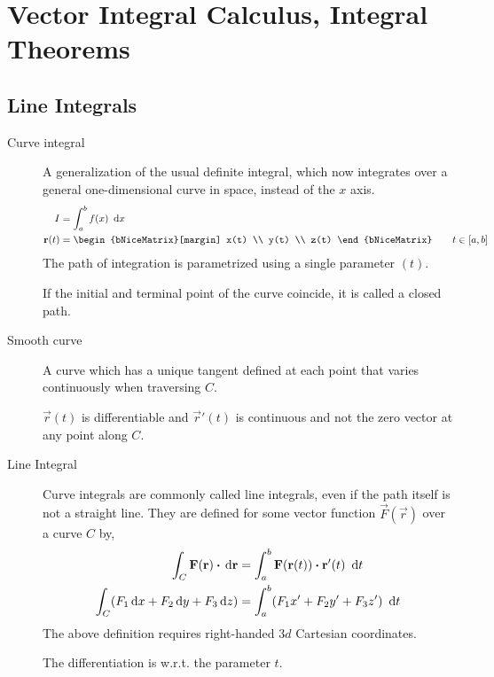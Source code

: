 \chapter{Vector Integral Calculus, Integral Theorems}

\section{Line Integrals}

\begin{description}
    \item[Curve integral] A generalization of the usual definite integral, which now
        integrates over a general one-dimensional curve in space, instead of the $ x $
        axis.
        \begin{align}
            I          & = \int_{a}^{b} f(x)\ \dl x              \\
            \vec{r}(t) & = \begin{bNiceMatrix}[margin]
                               x(t) \\ y(t) \\ z(t)
                           \end{bNiceMatrix} \qquad t \in [a, b]
        \end{align}
        The path of integration is parametrized using a single parameter $ (t) $.
        \par If the initial and terminal point of the curve coincide, it is called a
        closed path. \par

    \item[Smooth curve] A curve which has a unique tangent defined at each point that
        varies continuously when traversing $ C $. \par
        $ \vec{r}(t) $ is differentiable and $ \vec{r}'(t) $ is continuous and not the
        zero vector at any point along $ C $.

    \item[Line Integral] Curve integrals are commonly called line integrals, even if the
        path itself is not a straight line. They are defined for some vector function
        $ \vec{F}(\vec{r}) $ over a curve $ C $ by,
        \begin{align}
            \int_{C} \vec{F}(\vec{r}) \dotp \dl{\vec{r}} & =
            \int_{a}^{b} \vec{F}(\vec{r}(t)) \dotp \vec{r}'(t)\ \dl t \\
            \int_{C} (F_1 \dl x + F_2 \dl y + F_3 \dl z) & =
            \int_{a}^{b} (F_1 x' + F_2 y' + F_3 z')\ \dl t
        \end{align}
        The above definition requires right-handed $ 3d $ Cartesian coordinates. \par
        The differentiation is w.r.t. the parameter $ t $.


\end{description}
